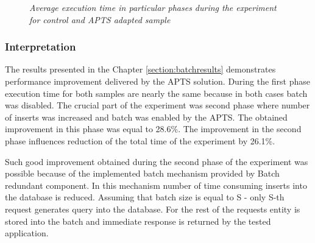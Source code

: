 \documentclass[12pt,a4paper]{article}
\begin{document}
\mydata
\begin{figure}[!htb]
\centering
{}
\caption{\textit{Average execution time in particular phases during the experiment for control and APTS adapted sample}} \label{batchEvalResutlsGraph}
\end{figure}

\subsubsection{Interpretation} 

The results presented in the Chapter \ref{section:batchresults} demonstrates performance improvement delivered by the APTS solution. During the first phase execution time for both samples are nearly the same because in both cases batch was disabled. The crucial part of the experiment was second phase where number of inserts was increased and batch was enabled by the APTS. The obtained improvement in this phase was equal to 28.6\%. The improvement in the second phase influences reduction of the total time of the experiment by 26.1\%. 

Such good improvement obtained during the second phase of the experiment was possible because of the implemented batch mechanism provided by Batch redundant component. In this mechanism number of time consuming inserts into the database is reduced. Assuming that batch size is equal to S - only S-th request generates query into the database. For the rest of the requests entity is stored into the batch and immediate response is returned by the tested application. 
\end{document}
